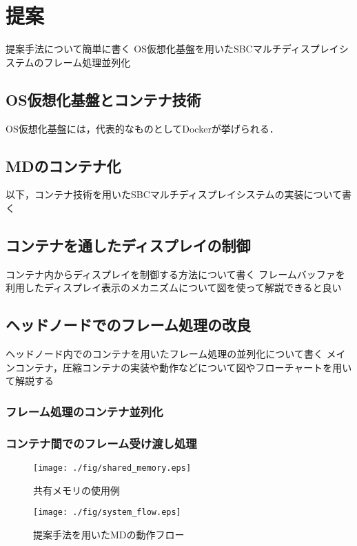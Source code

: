 \chapter{提案}
提案手法について簡単に書く
OS仮想化基盤を用いたSBCマルチディスプレイシステムのフレーム処理並列化

\section{OS仮想化基盤とコンテナ技術}
OS仮想化基盤には，代表的なものとしてDockerが挙げられる．


\section{MDのコンテナ化}
以下，コンテナ技術を用いたSBCマルチディスプレイシステムの実装について書く

\section{コンテナを通したディスプレイの制御}
コンテナ内からディスプレイを制御する方法について書く
フレームバッファを利用したディスプレイ表示のメカニズムについて図を使って解説できると良い


\section{ヘッドノードでのフレーム処理の改良}
ヘッドノード内でのコンテナを用いたフレーム処理の並列化について書く
メインコンテナ，圧縮コンテナの実装や動作などについて図やフローチャートを用いて解説する

\subsection*{フレーム処理のコンテナ並列化}
\subsection*{コンテナ間でのフレーム受け渡し処理}
\begin{figure}[H]
    \hspace*{\fill}
    \texttt{[image: ./fig/shared\_memory.eps]}
    \hspace*{\fill}
    \caption{共有メモリの使用例}
   \end{figure}

\begin{figure}[H]
    \hspace*{\fill}
    \texttt{[image: ./fig/system\_flow.eps]}
    \hspace*{\fill}
    \caption{提案手法を用いたMDの動作フロー}
   \end{figure}
